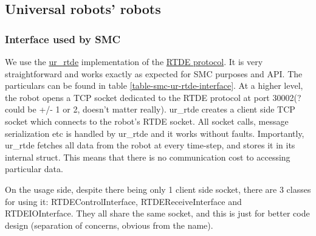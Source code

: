 \subsection{Universal robots' robots}
\subsubsection{Interface used by SMC}
We use the \href{https://sdurobotics.gitlab.io/ur_rtde/introduction/introduction.html}{ur\_rtde}
implementation of the \href{https://www.universal-robots.com/developer/communication-protocol/rtde/}{RTDE protocol}.
It is very straightforward and works exactly as expected for SMC purposes and API.
The particulars can be found in table \ref{table-smc-ur-rtde-interface}.
At a higher level, the robot opens a TCP socket dedicated to the RTDE protocol 
at port 30002(? could be +/- 1 or 2, doesn't matter really).
ur\_rtde creates a client side TCP socket which connects to the robot's RTDE socket.
All socket calls, message serialization etc is handled by ur\_rtde and it works without faults.
Importantly,  ur\_rtde fetches all data from the robot at every time-step,
and stores it in its internal struct. This means that there is no communication
cost to accessing particular data.

On the usage side, despite there being only 1 client side socket, there are 3 classes for using it:
RTDEControlInterface, RTDEReceiveInterface and RTDEIOInterface.
They all share the same socket, and this is just for better code design
(separation of concerns, obvious from the name).

